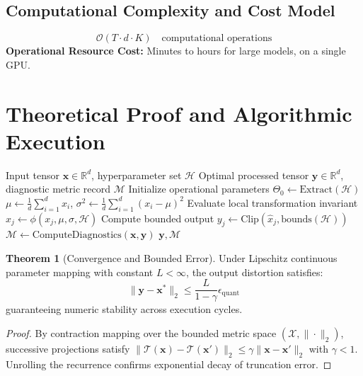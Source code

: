 \documentclass[11pt,a4paper]{article}
\theoremstyle{definition}
\newtheorem{theorem}{\textbf{Theorem}}[section]
\begin{document}
\subsection{Computational Complexity and Cost Model}
\begin{equation}
\mathcal{O}(T \cdot d \cdot K) \quad \text{computational operations}
\end{equation}
\textbf{Operational Resource Cost:} Minutes to hours for large models, on a single GPU.

\section{Theoretical Proof and Algorithmic Execution}

\begin{algorithm}[H]
\caption{GPTQ (second-order weight quantization) Operational Pipeline}
\begin{algorithmic}[1]
\Require Input tensor $\mathbf{x} \in \mathbb{R}^d$, hyperparameter set $\mathcal{H}$
\Ensure Optimal processed tensor $\mathbf{y} \in \mathbb{R}^d$, diagnostic metric record $\mathcal{M}$
\State Initialize operational parameters $\Theta_0 \leftarrow \text{Extract}(\mathcal{H})$
\State $\mu \leftarrow \frac{1}{d} \sum_{i=1}^d x_i$, \quad $\sigma^2 \leftarrow \frac{1}{d} \sum_{i=1}^d (x_i - \mu)^2$
    \State Evaluate local transformation invariant $\hat{x}_j \leftarrow \phi(x_j, \mu, \sigma, \mathcal{H})$
    \State Compute bounded output $y_j \leftarrow \text{Clip}(\hat{x}_j, \text{bounds}(\mathcal{H}))$
\EndFor
\State $\mathcal{M} \leftarrow \text{ComputeDiagnostics}(\mathbf{x}, \mathbf{y})$
\State \Return $\mathbf{y}, \mathcal{M}$
\end{algorithmic}
\end{algorithm}

\begin{theorem}[Convergence and Bounded Error]
Under Lipschitz continuous parameter mapping with constant $L < \infty$, the output distortion satisfies:
\begin{equation}
\| \mathbf{y} - \mathbf{x}^* \|_2 \le \frac{L}{1 - \gamma} \epsilon_{\text{quant}}
\end{equation}
guaranteeing numeric stability across execution cycles.
\end{theorem}

\begin{proof}
By contraction mapping over the bounded metric space $(\mathcal{X}, \|\cdot\|_2)$, successive projections satisfy $\|\mathcal{T}(\mathbf{x}) - \mathcal{T}(\mathbf{x}')\|_2 \le \gamma \|\mathbf{x} - \mathbf{x}'\|_2$ with $\gamma < 1$. Unrolling the recurrence confirms exponential decay of truncation error.
\end{proof}
\end{document}
